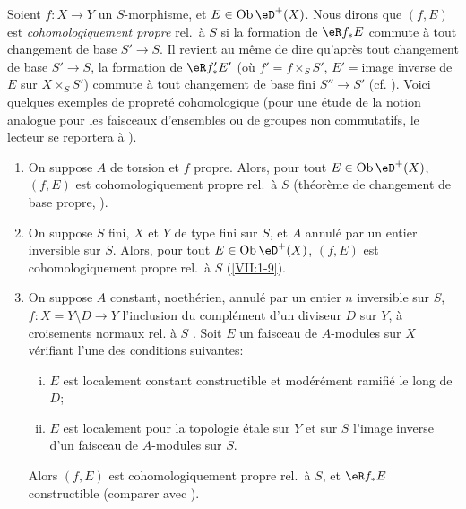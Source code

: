 Soient $f:X\to Y$ un $S$-morphisme, et $E\in\ob\eD^+(X)$. Nous dirons que 
$(f,E)$ est \emph{cohomologiquement propre} rel.\ \`a $S$ si la formation de 
$\eR f_\ast E$ commute \`a tout changement de base $S'\to S$. Il revient au 
m\^eme de dire qu'apr\`es tout changement de base $S'\to S$, la formation de 
$\eR f_\ast' E'$ (o\`u $f'=f\times_S S'$, $E'=$image inverse de $E$ sur 
$X\times_S S'$) commute \`a tout changement de base fini $S'' \to S'$ (cf. 
\cite[XII 6.1]{sga4}). Voici quelques exemples de propret\'e cohomologique 
(pour une \'etude de la notion analogue pour les faisceaux d'ensembles ou de 
groupes non commutatifs, le lecteur se reportera \`a \cite[XIII]{sga1}). 
\begin{enumerate} %
  \item On suppose $A$ de torsion et $f$ propre. Alors, pour tout 
    $E\in\ob\eD^+(X)$, $(f,E)$ est cohomologiquement propre rel.\ \`a $S$ 
    (th\'eor\`eme de changement de base propre, \cite[XII 5.1]{sga4}). 
  \item On suppose $S$ fini, $X$ et $Y$ de type fini sur $S$, et $A$ annul\'e 
    par un entier inversible sur $S$. Alors, pour tout $E\in\ob\eD^+(X)$, 
    $(f,E)$ est cohomologiquement propre rel.\ \`a $S$ 
    (\ref{VII:1-9}). 
  \item On suppose $A$ constant, noeth\'erien, annul\'e par un entier $n$ 
    inversible sur $S$, $f:X=Y\setminus D\to Y$ l'inclusion du compl\'ement 
    d'un diviseur $D$ sur $Y$, \`a croisements normaux rel. \`a $S$ 
    \cite[XIII 2.1]{sga1}. Soit $E$ un faisceau de $A$-modules sur $X$ 
    v\'erifiant l'une des conditions suivantes: 
    \begin{enumerate}[(i)]
      \item $E$ est localement constant constructible et mod\'er\'ement 
        ramifi\'e le long de $D$; 
      \item $E$ est localement pour la topologie \'etale sur $Y$ et sur $S$ 
        l'image inverse d'un faisceau de $A$-modules sur $S$. 
    \end{enumerate}
    Alors $(f,E)$ est cohomologiquement propre rel.\ \`a $S$, et $\eR f_\ast E$ 
    constructible (comparer avec \cite[XIII 2.4]{sga1}). 
\end{enumerate} 

